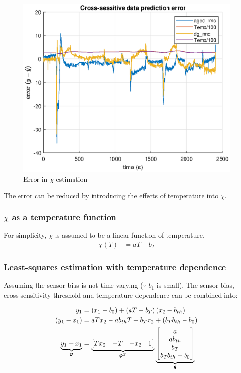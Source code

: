 \begin{figure}[H]
    \centering
    \includegraphics[width = 0.5 \textwidth]{./figs/chi_est/chi_error.eps}
    \caption{Error in $\chi$ estimation}
\end{figure}

The error can be reduced by introducing the effects of temperature into $\chi$.


\subsubsection{$\chi$ as a temperature function}
For simplicity, $\chi$ is assumed to be a linear function of temperature.
\begin{align*}
    \chi(T) &= a T - b_T
\end{align*}

\subsubsection{Least-squares estimation with temperature dependence}
Assuming the sensor-bias is not time-varying ($\because$ $b_1$ is small). The
sensor bias, cross-sensitivity threshold and temperature dependence can be
combined into:

\begin{align*}
    y_1 &=  \left( x_1 - b_0 \right) + \left( aT - b_{T} \right) \left( x_2 - b_{th} \right)\\
    \left( y_1 - x_1 \right) &= a T x_2 - a b_{th} T - b_{T} x_2 + (b_T b_{th} - b_0)\\
    \underbrace{y_1 - x_1}_{\pmb y} &= \underbrace{\begin{bmatrix} T x_2 & -T & -x_2 & 1 \end{bmatrix}}_{\pmb \phi^T} \underbrace{\begin{bmatrix} a \\ a b_{th} \\ b_T \\ b_T b_{th} - b_0 \end{bmatrix}}_{\pmb \theta}\\
\end{align*}

